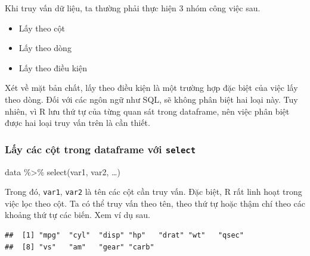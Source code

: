 \documentclass[]{krantz}
\makeatletter
\newenvironment{Shaded}{\begin{snugshade}}{\end{snugshade}}
\newcommand{\CommentTok}[1]{\textcolor[rgb]{0.37,0.37,0.37}{\textit{#1}}}
\newcommand{\KeywordTok}[1]{\textcolor[rgb]{0.27,0.27,0.27}{\textbf{#1}}}
\newcommand{\NormalTok}[1]{#1}
\newcommand{\OperatorTok}[1]{\textcolor[rgb]{0.43,0.43,0.43}{\textbf{#1}}}
\newcommand{\StringTok}[1]{\textcolor[rgb]{0.5,0.5,0.5}{#1}}
\providecommand{\tightlist}{%
  \setlength{\itemsep}{0pt}\setlength{\parskip}{0pt}}
\renewenvironment{quote}{\begin{VF}}{\end{VF}}
\newenvironment{kframe}{%
\medskip{}
\setlength{\fboxsep}{.8em}
 \def\at@end@of@kframe{}%
 \ifinner\ifhmode%
  \def\at@end@of@kframe{\end{minipage}}%
  \begin{minipage}{\columnwidth}%
 \fi\fi%
 \def\FrameCommand##1{\hskip\@totalleftmargin \hskip-\fboxsep
 \colorbox{shadecolor}{##1}\hskip-\fboxsep
     \hskip-\linewidth \hskip-\@totalleftmargin \hskip\columnwidth}%
 \MakeFramed {\advance\hsize-\width
   \@totalleftmargin\z@ \linewidth\hsize
   \@setminipage}}%
 {\par\unskip\endMakeFramed%
 \at@end@of@kframe}
\renewenvironment{Shaded}{\begin{kframe}}{\end{kframe}}
\renewenvironment{Shaded}{\begin{snugshade}}{\end{snugshade}}
\renewcommand{\CommentTok}[1]{\textcolor[rgb]{0.56,0.35,0.01}{\textit{#1}}}
\renewcommand{\KeywordTok}[1]{\textcolor[rgb]{0.13,0.29,0.53}{\textbf{#1}}}
\renewcommand{\NormalTok}[1]{#1}
\renewcommand{\OperatorTok}[1]{\textcolor[rgb]{0.81,0.36,0.00}{\textbf{#1}}}
\renewcommand{\StringTok}[1]{\textcolor[rgb]{0.31,0.60,0.02}{#1}}
\theoremstyle{definition}
\theoremstyle{definition}
\theoremstyle{definition}
\theoremstyle{remark}
\makeatother
\begin{document}
Khi truy vấn dữ liệu, ta thường phải thực hiện 3 nhóm công việc sau.

\begin{itemize}
\tightlist
\item
  Lấy theo cột
\item
  Lấy theo dòng
\item
  Lấy theo điều kiện
\end{itemize}

Xét về mặt bản chất, lấy theo điều kiện là một trường hợp đặc biệt của
việc lấy theo dòng. Đối với các ngôn ngữ như SQL, sẽ không phân biệt hai
loại này. Tuy nhiên, vì R lưu thứ tự của từng quan sát trong dataframe,
nên việc phân biệt được hai loại truy vấn trên là cần thiết.

\hypertarget{ly-cac-ct-trong-dataframe-vi-select}{%
\subsubsection{\texorpdfstring{Lấy các cột trong dataframe với
\texttt{select}}{Lấy các cột trong dataframe với select}}\label{ly-cac-ct-trong-dataframe-vi-select}}

\begin{quote}
data \%\textgreater{}\% select(var1, var2, \ldots{})
\end{quote}

Trong đó, \texttt{var1}, \texttt{var2} là tên các cột cần truy vấn. Đặc
biệt, R rất linh hoạt trong việc lọc theo cột. Ta có thể truy vấn theo
tên, theo thứ tự hoặc thậm chí theo các khoảng thứ tự các biến. Xem ví
dụ sau.

\begin{Shaded}
\end{Shaded}

\begin{verbatim}
##  [1] "mpg"  "cyl"  "disp" "hp"   "drat" "wt"   "qsec"
##  [8] "vs"   "am"   "gear" "carb"
\end{verbatim}

\begin{Shaded}
\end{Shaded}
\end{document}
